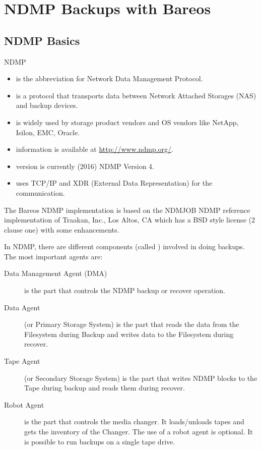 \chapter{NDMP Backups with Bareos}


\section{NDMP Basics}

NDMP
\begin{itemize}
    \item is the abbreviation for Network Data Management Protocol.
    \item is a protocol that transports data between Network Attached Storages (NAS) and backup devices.
    \item is widely used by storage product vendors and OS vendors like NetApp, Isilon, EMC, Oracle.
    \item information is available at \url{http://www.ndmp.org/}.
    \item version is currently (2016) NDMP Version 4.
    \item uses TCP/IP and XDR (External Data Representation) for the communication.
\end{itemize}



The Bareos NDMP implementation is based on the NDMJOB NDMP reference implementation of Traakan, Inc., Los Altos, CA which has a BSD style license (2 clause one) with some enhancements.


In NDMP, there are different components (called ) involved in doing backups.
The most important agents are:

\begin{description}
  \item[Data Management Agent (DMA)]
  is the part that controls the NDMP backup or recover operation.

  \item[Data Agent] (or Primary Storage System)
  is the part that reads the data from the Filesystem during Backup and writes data to the Filesystem during recover.

  \item[Tape Agent] (or Secondary Storage System)
  is the part that writes NDMP blocks to the Tape during backup and reads them during recover.

  \item[Robot Agent]
  is the part that controls the media changer. It loads/unloads tapes and gets the inventory of the Changer. The use of a robot agent is optional. It is possible to run backups on a single tape drive.
\end{description}

